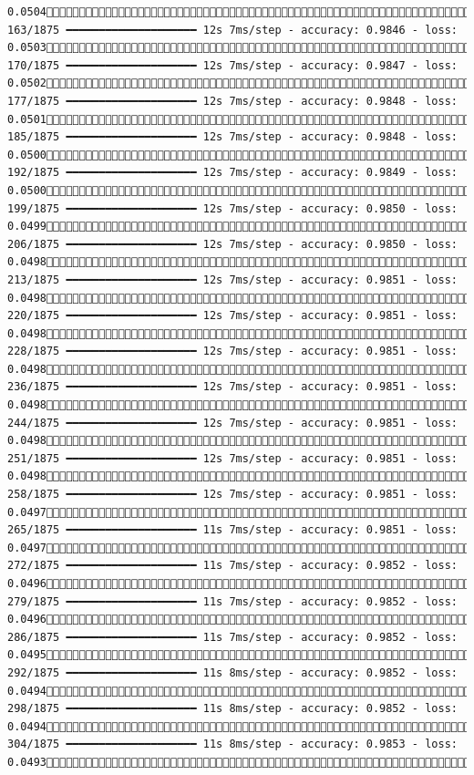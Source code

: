 \documentclass[
  letterpaper,
  DIV=11,
  numbers=noendperiod]{scrreprt}
\begin{document}
\begin{verbatim}
0.0504 163/1875 ━━━━━━━━━━━━━━━━━━━━ 12s 7ms/step - accuracy: 0.9846 - loss: 0.0503 170/1875 ━━━━━━━━━━━━━━━━━━━━ 12s 7ms/step - accuracy: 0.9847 - loss: 0.0502 177/1875 ━━━━━━━━━━━━━━━━━━━━ 12s 7ms/step - accuracy: 0.9848 - loss: 0.0501 185/1875 ━━━━━━━━━━━━━━━━━━━━ 12s 7ms/step - accuracy: 0.9848 - loss: 0.0500 192/1875 ━━━━━━━━━━━━━━━━━━━━ 12s 7ms/step - accuracy: 0.9849 - loss: 0.0500 199/1875 ━━━━━━━━━━━━━━━━━━━━ 12s 7ms/step - accuracy: 0.9850 - loss: 0.0499 206/1875 ━━━━━━━━━━━━━━━━━━━━ 12s 7ms/step - accuracy: 0.9850 - loss: 0.0498 213/1875 ━━━━━━━━━━━━━━━━━━━━ 12s 7ms/step - accuracy: 0.9851 - loss: 0.0498 220/1875 ━━━━━━━━━━━━━━━━━━━━ 12s 7ms/step - accuracy: 0.9851 - loss: 0.0498 228/1875 ━━━━━━━━━━━━━━━━━━━━ 12s 7ms/step - accuracy: 0.9851 - loss: 0.0498 236/1875 ━━━━━━━━━━━━━━━━━━━━ 12s 7ms/step - accuracy: 0.9851 - loss: 0.0498 244/1875 ━━━━━━━━━━━━━━━━━━━━ 12s 7ms/step - accuracy: 0.9851 - loss: 0.0498 251/1875 ━━━━━━━━━━━━━━━━━━━━ 12s 7ms/step - accuracy: 0.9851 - loss: 0.0498 258/1875 ━━━━━━━━━━━━━━━━━━━━ 12s 7ms/step - accuracy: 0.9851 - loss: 0.0497 265/1875 ━━━━━━━━━━━━━━━━━━━━ 11s 7ms/step - accuracy: 0.9851 - loss: 0.0497 272/1875 ━━━━━━━━━━━━━━━━━━━━ 11s 7ms/step - accuracy: 0.9852 - loss: 0.0496 279/1875 ━━━━━━━━━━━━━━━━━━━━ 11s 7ms/step - accuracy: 0.9852 - loss: 0.0496 286/1875 ━━━━━━━━━━━━━━━━━━━━ 11s 7ms/step - accuracy: 0.9852 - loss: 0.0495 292/1875 ━━━━━━━━━━━━━━━━━━━━ 11s 8ms/step - accuracy: 0.9852 - loss: 0.0494 298/1875 ━━━━━━━━━━━━━━━━━━━━ 11s 8ms/step - accuracy: 0.9852 - loss: 0.0494 304/1875 ━━━━━━━━━━━━━━━━━━━━ 11s 8ms/step - accuracy: 0.9853 - loss: 0.0493 
\end{verbatim}
\end{document}
